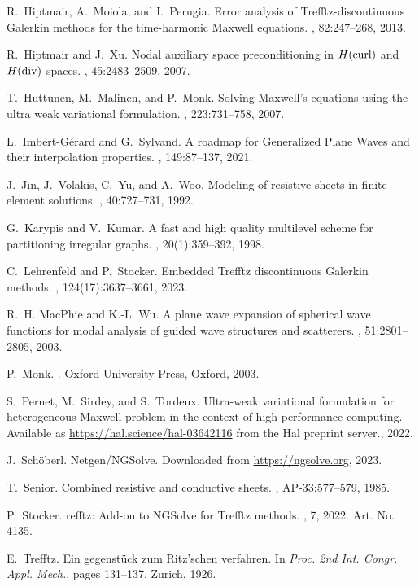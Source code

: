 \documentclass[a4paper,12pt]{article}
\begin{document}
\begin{thebibliography}{10}
R.~Hiptmair, A.~Moiola, and I.~Perugia.
\newblock Error analysis of {T}refftz-discontinuous {G}alerkin methods for the
  time-harmonic {M}axwell equations.
, 82:247--268, 2013.

R.~Hiptmair and J.~Xu.
\newblock Nodal auxiliary space preconditioning in ${H}({\rm curl})$ and
  ${H}({\rm div})$ spaces.
, 45:2483--2509, 2007.

T.~Huttunen, M.~Malinen, and P.~Monk.
\newblock Solving {M}axwell's equations using the ultra weak variational
  formulation.
, 223:731--758, 2007.

L.~Imbert-G\'erard and G.~Sylvand.
\newblock A roadmap for {G}eneralized {P}lane {W}aves and their interpolation
  properties.
, 149:87–137, 2021.

J.~Jin, J.~Volakis, C.~Yu, and A.~Woo.
\newblock Modeling of resistive sheets in finite element solutions.
, 40:727--731, 1992.

G.~Karypis and V.~Kumar.
\newblock A fast and high quality multilevel scheme for partitioning irregular
  graphs.
, 20(1):359--392, 1998.

C.~Lehrenfeld and P.~Stocker.
\newblock Embedded {T}refftz discontinuous {G}alerkin methods.
, 124(17):3637--3661, 2023.

R.~H. MacPhie and K.-L. Wu.
\newblock A plane wave expansion of spherical wave functions for modal analysis
  of guided wave structures and scatterers.
, 51:2801--2805, 2003.

P.~Monk.
.
\newblock Oxford University Press, Oxford, 2003.

S.~Pernet, M.~Sirdey, and S.~Tordeux.
\newblock Ultra-weak variational formulation for heterogeneous {M}axwell
  problem in the context of high performance computing.
\newblock Available as \url{https://hal.science/hal-03642116} from the Hal
  preprint server., 2022.

J.~Sch\"oberl.
\newblock Netgen/{NGS}olve.
\newblock Downloaded from \url{https://ngsolve.org}, 2023.

T.~Senior.
\newblock Combined resistive and conductive sheets.
, AP-33:577--579, 1985.

P.~Stocker.
refftz: {A}dd-on to {NGS}olve for {T}refftz methods.
, 7, 2022.
\newblock Art. No. 4135.

E.~Trefftz.
\newblock Ein gegenst\"{u}ck zum {R}itz'schen verfahren.
\newblock In {\em Proc. 2nd Int. Congr. Appl. Mech.}, pages 131--137, Zurich,
  1926.

\end{thebibliography}
\end{document}
